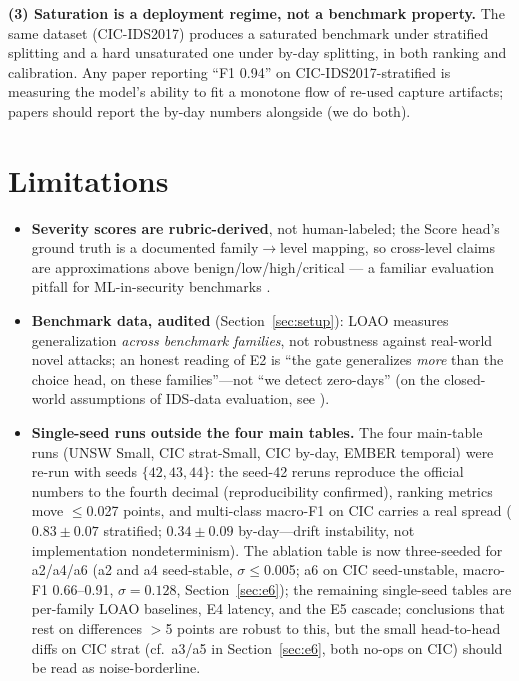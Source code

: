 \documentclass[sigconf,anonymous=false]{acmart}
\begin{document}
\textbf{(3) Saturation is a deployment regime, not a benchmark property.} The same dataset (CIC-IDS2017) produces a saturated benchmark under stratified splitting and a hard unsaturated one under by-day splitting, in both ranking and calibration. Any paper reporting ``F1 0.94'' on CIC-IDS2017-stratified is measuring the model's ability to fit a monotone flow of re-used capture artifacts; papers should report the by-day numbers alongside (we do both).

\section{Limitations}
\label{sec:limits}

\begin{itemize}
\item \textbf{Severity scores are rubric-derived}, not human-labeled; the Score head's ground truth is a documented family$\to$level mapping, so cross-level claims are approximations above benign/low/high/critical --- a familiar evaluation pitfall for ML-in-security benchmarks \cite{arp2022donts}.

\item \textbf{Benchmark data, audited} (Section~\ref{sec:setup}): LOAO measures generalization \emph{across benchmark families}, not robustness against real-world novel attacks; an honest reading of E2 is ``the gate generalizes \emph{more} than the choice head, on these families''---not ``we detect zero-days'' (on the closed-world assumptions of IDS-data evaluation, see \cite{sommer2011contextual}).

\item \textbf{Single-seed runs outside the four main tables.} The four main-table runs (UNSW Small, CIC strat-Small, CIC by-day, EMBER temporal) were re-run with seeds $\{42,43,44\}$: the seed-42 reruns reproduce the official numbers to the fourth decimal (reproducibility confirmed), ranking metrics move $\le$0.027 points, and multi-class macro-F1 on CIC carries a real spread ($0.83\pm0.07$ stratified; $0.34\pm0.09$ by-day---drift instability, not implementation nondeterminism). The ablation table is now three-seeded for a2/a4/a6 (a2 and a4 seed-stable, $\sigma\le$0.005; a6 on CIC seed-unstable, macro-F1 0.66--0.91, $\sigma{=}0.128$, Section~\ref{sec:e6}); the remaining single-seed tables are per-family LOAO baselines, E4 latency, and the E5 cascade; conclusions that rest on differences $>$5 points are robust to this, but the small head-to-head diffs on CIC strat (cf.~a3/a5 in Section~\ref{sec:e6}, both no-ops on CIC) should be read as noise-borderline.


\end{itemize}
\end{document}
